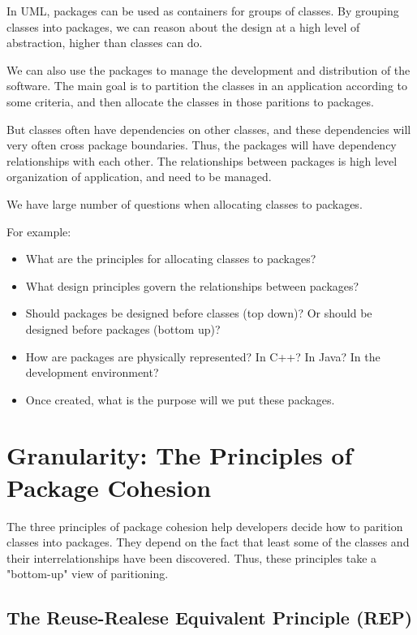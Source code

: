 \documentclass[12pt]{report}
\begin{document}
In UML, packages can be used as containers for groups of classes. 
By grouping classes into packages, 
we can reason about the design at a high level of abstraction,
higher than classes can do. 

We can also use the packages to manage the development 
and distribution of the software. 
The main goal is to partition the classes in an application according
to some criteria, and then allocate the classes 
in those paritions to packages. 

But classes often have dependencies on other classes,
and these dependencies will very often cross package boundaries. 
Thus, the packages will have dependency relationships with each other. 
The relationships between packages is 
high level organization of application,
and need to be managed.

We have large number of questions when allocating classes to packages.

For example:
\begin{itemize}
    \item What are the principles 
        for allocating classes to packages?
    \item What design principles govern the 
        relationships between packages?
    \item Should packages be designed before classes (top down)? 
        Or should be designed before packages (bottom up)?
    \item How are packages are physically represented? 
        In C++? In Java? In the development environment?
    \item Once created, what is the purpose will 
        we put these packages.
\end{itemize}

\section{Granularity: The Principles of Package Cohesion}
The three principles of package cohesion help developers decide how to parition classes into packages. 
They depend on the fact that least some of the classes 
and their interrelationships have been discovered. 
Thus, these principles take a "bottom-up" view of paritioning.

\subsection{The Reuse-Realese Equivalent Principle (REP)}
\end{document}
